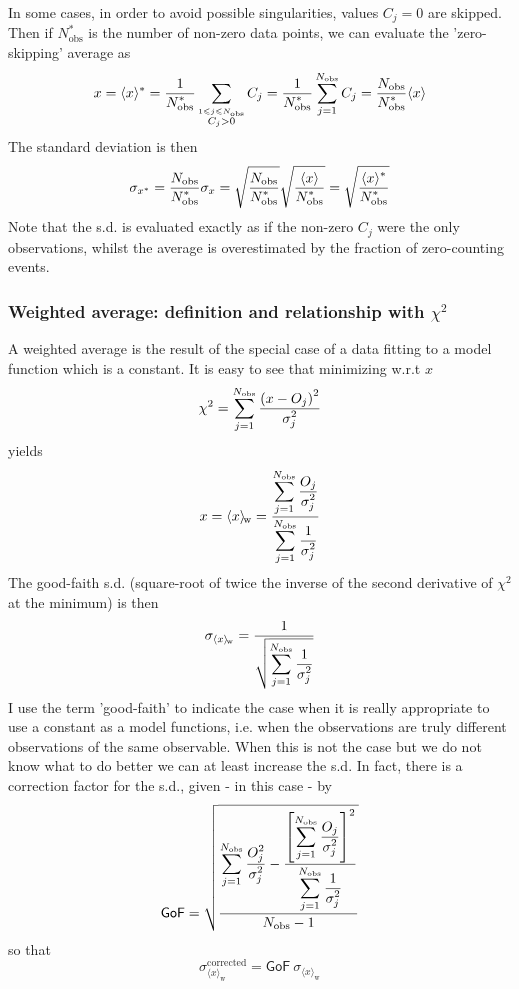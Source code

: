 In some cases, in order to avoid possible singularities, 
values $C_j=0$ are skipped. Then if $N_{\mathrm{obs}}^*$ is the number of non-zero data points,
we can evaluate the 'zero-skipping' average as
\[
x=\langle x\rangle^*=\DSF{1}{ N_{\mathrm{obs}}^*}
 \mathop{\sum}_ {\stackrel{1\leqslant j\leqslant N_{\mathrm{obs}}}{{C_j>0}}}
 C_j=\DSF{1}{ N_{\mathrm{obs}}^*}
 \mathop{\sum}_{j=1}^{N_{\mathrm{obs}}}C_j = \DSF{N_{\mathrm{obs}}}{N_{\mathrm{obs}}^*}\langle x\rangle
\]
The standard deviation is then
\[
\sigma_{x^*}= \DSF{N_{\mathrm{obs}}}{N_{\mathrm{obs}}^*}\sigma_x = \sqrt{\DSF{N_{\mathrm{obs}}}{N_{\mathrm{obs}}^*}}
\sqrt{\DSF{\langle x\rangle}{N_{\mathrm{obs}}^*}}=\sqrt{\DSF{\langle x\rangle^*}{N_{\mathrm{obs}}^*}}
\]
Note that the s.d. is evaluated exactly as if the non-zero $C_j$ were the only observations, 
whilst the average is overestimated by the fraction of zero-counting events.

\subsubsection{Weighted average: definition and relationship with $\chi^2$}

A weighted average is the result of the special case of a data fitting to a model function which is a constant.
It is easy to see that minimizing w.r.t $x$
\[
\chi^2 = \mathop{\sum}_{j=1}^{N_{\mathrm{obs}}}
\DSF{\lrb{x-O_j}^2
}{
\sigma_j^2
}
\]
yields
\[
x= \langle x \rangle_{\!\mathrm{w}}=\DSF{
\mathop{\sum}_{j=1}^{N_{\mathrm{obs}}}
\DSF{O_j
}{
\sigma_j^2
}
}{
\mathop{\sum}_{j=1}^{N_{\mathrm{obs}}}
\DSF{1
}{
\sigma_j^2
}
}
\]
The good-faith s.d. (square-root of twice the inverse of the second derivative of $\chi^2$ at the minimum) 
is then
\[
\sigma_{\langle x \rangle_{\!\mathrm{w}}} = \DSF{
1
}{\sqrt{
\mathop{\sum}_{j=1}^{N_{\mathrm{obs}}}
\DSF{1
}{
\sigma_j^2
}
}}
\]
I use the term 'good-faith' to indicate the case when it is really appropriate to use a constant as a model functions, 
i.e. when the observations are truly different observations of the same observable. 
When this is not the case but we do not know what to do better we can at least increase the s.d. 
In fact, there is a correction factor for the s.d., given - in this case - by
\[
\mathsf{GoF}=
\sqrt{
\DSF{
\mathop{\sum}_{j=1}^{N_{\mathrm{obs}}}
\DSF{O_j^2
}{
\sigma_j^2
}
-\DSF{
\lrs{
\mathop{\sum}_{j=1}^{N_{\mathrm{obs}}}
\DSF{O_j
}{
\sigma_j^2
}
}^2
}{ \mathop{\sum}_{j=1}^{N_{\mathrm{obs}}}
\DSF{1
}{
\sigma_j^2
} }
}{
N_{\mathrm{obs}}-1
}
}
\]
so that
\[
{\sigma}_{\langle x \rangle_{\!\mathrm{w}}}^{\mathrm{corrected}} = \mathsf{GoF}\ \sigma_{\langle x \rangle_{\!\mathrm{w}}}
\] 

